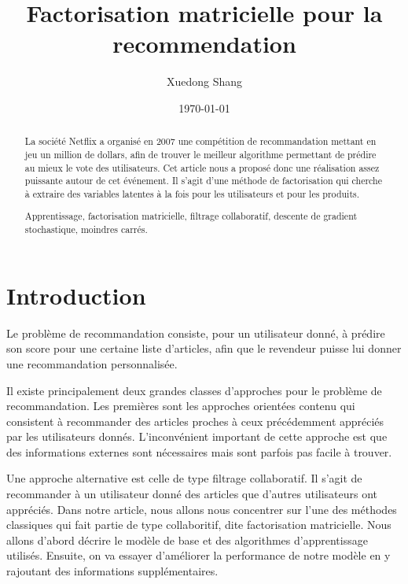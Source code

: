 \documentclass{article}
\newenvironment{clef}
{\description\item[Mots-cl\'es.]}
{\enddescription}
\theoremstyle{plain}
\theoremstyle{definition}
\theoremstyle{remark}
\begin{document}
\title{Factorisation matricielle pour la recommendation\cite{Koren09}}

\author{Xuedong Shang}

\date\today

\maketitle

\tableofcontents

\begin{abstract}
La soci\'et\'e Netflix a organis\'e en 2007 une comp\'etition de recommandation mettant en jeu un million de dollars, afin de trouver le meilleur algorithme permettant de pr\'edire au mieux le vote des utilisateurs. Cet article nous a propos\'e donc une r\'ealisation assez puissante autour de cet \'ev\'enement. Il s'agit d'une m\'ethode de factorisation qui cherche \`a extraire des variables latentes \`a la fois pour les utilisateurs et pour les produits.
  
\begin{clef}
  Apprentissage, factorisation matricielle, filtrage collaboratif, descente de gradient stochastique, moindres carr\'es.
\end{clef}
\end{abstract}

\section{Introduction}
Le probl\`eme de recommandation consiste, pour un utilisateur donn\'e, \`a pr\'edire son score pour une certaine liste d'articles, afin que le revendeur puisse lui donner une recommandation personnalis\'ee.

Il existe principalement deux grandes classes d'approches pour le probl\`eme de recommandation. Les premi\`eres sont les approches orient\'ees contenu qui consistent \`a recommander des articles proches \`a ceux pr\'ec\'edemment appr\'eci\'es par les utilisateurs donn\'es. L'inconv\'enient important de cette approche est que des informations externes sont n\'ecessaires mais sont parfois pas facile \`a trouver.

Une approche alternative est celle de type filtrage collaboratif. Il s'agit de recommander \`a un utilisateur donn\'e des articles que d'autres utilisateurs ont appr\'eci\'es. Dans notre article, nous allons nous concentrer sur l'une des m\'ethodes classiques qui fait partie de type collaboritif, dite factorisation matricielle. Nous allons d'abord d\'ecrire le mod\`ele de base et des algorithmes d'apprentissage utilis\'es. Ensuite, on va essayer d'am\'eliorer la performance de notre mod\`ele en y rajoutant des informations suppl\'ementaires.
\end{document}
